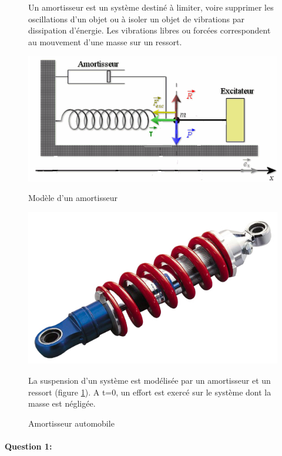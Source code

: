 \begin{figure}[htbp]
\begin{minipage}[c]{.55\linewidth}
Un amortisseur est un système destiné à limiter, voire supprimer les oscillations d'un objet ou à isoler un objet de vibrations par dissipation d'énergie. Les vibrations libres ou forcées correspondent au mouvement d'une masse sur un ressort.
\begin{center}
\includegraphics[width=0.8\linewidth]{img/amortisseur1.png}
\caption{Modèle d'un amortisseur}
\label{fig:image3}
\end{center}
\end{minipage}
\hfill
\begin{minipage}[c]{.40\linewidth}
\begin{center}
\includegraphics[width=0.8\linewidth]{img/amortisseur.jpg}
\caption{Amortisseur automobile}
\label{fig:image4}
\end{center}
La suspension d'un système est modélisée par un amortisseur et un ressort (figure \ref{fig:image4}). A t=0, un effort est exercé sur le système dont la masse est négligée.
\end{minipage}
\end{figure}

\paragraph{Question 1:}


